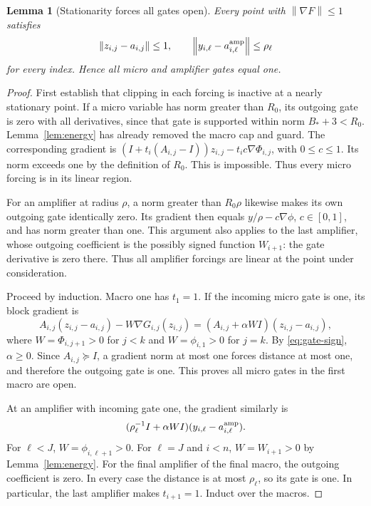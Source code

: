 \documentclass[11pt]{article}
\newtheorem{lemma}[theorem]{Lemma}
\theoremstyle{definition}
\theoremstyle{remark}
\newcommand{\norm}[1]{\left\|#1\right\|}
\begin{document}
\begin{lemma}[Stationarity forces all gates open]\label{lem:stationary}
Every point with $\norm{\nabla F}\le1$ satisfies
\begin{equation}\label{eq:complete}
 \norm{z_{i,j}-a_{i,j}}\le1,\qquad
 \norm{y_{i,\ell}-a^{\rm amp}_{i,\ell}}\le\rho_\ell
\end{equation}
for every index. Hence all micro and amplifier gates equal one.
\end{lemma}
\begin{proof}
First establish that clipping in each forcing is inactive at a nearly stationary point. If a micro variable has norm greater than $R_0$, its outgoing gate is zero with all derivatives, since that gate is supported within norm $B_*+3<R_0$. Lemma~\ref{lem:energy} has already removed the macro cap and guard. The corresponding gradient is
$(I+t_i(A_{i,j}-I))z_{i,j}-t_i c\nabla\Phi_{i,j}$, with $0\le c\le1$. Its norm exceeds one by the definition of $R_0$. This is impossible. Thus every micro forcing is in its linear region.

For an amplifier at radius $\rho$, a norm greater than $R_0\rho$ likewise makes its own outgoing gate identically zero. Its gradient then equals $y/\rho-c\nabla\phi$, $c\in[0,1]$, and has norm greater than one. This argument also applies to the last amplifier, whose outgoing coefficient is the possibly signed function $W_{i+1}$: the gate derivative is zero there. Thus all amplifier forcings are linear at the point under consideration.

Proceed by induction. Macro one has $t_1=1$. If the incoming micro gate is one, its block gradient is
\[
 A_{i,j}(z_{i,j}-a_{i,j})-W\nabla G_{i,j}(z_{i,j})
  =(A_{i,j}+\alpha W I)(z_{i,j}-a_{i,j}),
\]
where $W=\Phi_{i,j+1}>0$ for $j<k$ and $W=\phi_{i,1}>0$ for $j=k$. By \eqref{eq:gate-sign}, $\alpha\ge0$. Since $A_{i,j}\succeq I$, a gradient norm at most one forces distance at most one, and therefore the outgoing gate is one. This proves all micro gates in the first macro are open.

At an amplifier with incoming gate one, the gradient similarly is
\[
 (\rho_\ell^{-1}I+\alpha W I)
        (y_{i,\ell}-a^{\rm amp}_{i,\ell}).
\]
For $\ell<J$, $W=\phi_{i,\ell+1}>0$. For $\ell=J$ and $i<n$, $W=W_{i+1}>0$ by Lemma~\ref{lem:energy}. For the final amplifier of the final macro, the outgoing coefficient is zero. In every case the distance is at most $\rho_\ell$, so its gate is one. In particular, the last amplifier makes $t_{i+1}=1$. Induct over the macros.
\end{proof}
\end{document}
